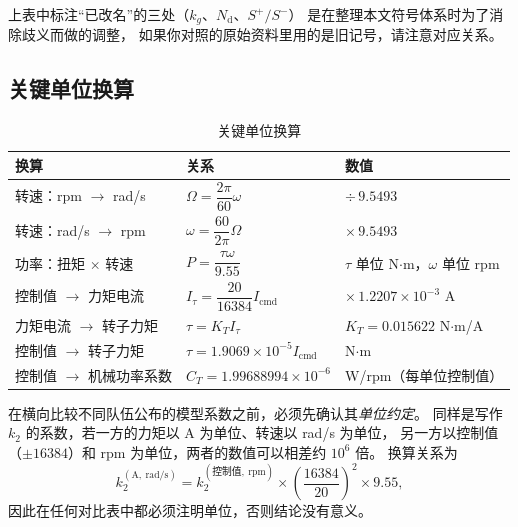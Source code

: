 \documentclass[cn,blue,11pt,device=normal]{elegantnote}
\newcommand{\Icmd}{I_{\mathrm{cmd}}{}}
\newcommand{\Itau}{I_{\tau}{}}
\newcommand{\KT}{K_{T}{}}
\newcommand{\CT}{C_{T}{}}
\begin{document}
\begin{remark}
上表中标注“已改名”的三处（$k_g$、$N_{\mathrm{d}}$、$S^{+}/S^{-}$）
是在整理本文符号体系时为了消除歧义而做的调整，
如果你对照的原始资料里用的是旧记号，请注意对应关系。
\end{remark}


\subsection{关键单位换算}

\begin{table}[htbp]
  \centering
  \small
  \caption{关键单位换算}
  \label{tab:units}
  \begin{tabular}{@{}lll@{}}
    \toprule
    换算 & 关系 & 数值 \\
    \midrule
    转速：rpm $\to$ rad/s      & $\Omega = \dfrac{2\pi}{60}\omega$ & $\div\,9.5493$ \\
    转速：rad/s $\to$ rpm      & $\omega = \dfrac{60}{2\pi}\Omega$ & $\times\,9.5493$ \\
    功率：扭矩 $\times$ 转速   & $P = \dfrac{\tau\omega}{9.55}$    & $\tau$ 单位 N$\cdot$m，$\omega$ 单位 rpm \\
    控制值 $\to$ 力矩电流      & $\Itau = \dfrac{20}{16384}\Icmd$  & $\times\,1.2207\times10^{-3}$ A \\
    力矩电流 $\to$ 转子力矩    & $\tau = \KT\Itau$                 & $\KT = 0.015622$ N$\cdot$m/A \\
    控制值 $\to$ 转子力矩      & $\tau = 1.9069\times10^{-5}\Icmd$ & N$\cdot$m \\
    控制值 $\to$ 机械功率系数  & $\CT = 1.99688994\times10^{-6}$   & W/rpm（每单位控制值） \\
    \bottomrule
  \end{tabular}
\end{table}

\begin{note}
在横向比较不同队伍公布的模型系数之前，必须先确认其\emph{单位约定}。
同样是写作 $k_2$ 的系数，若一方的力矩以 A 为单位、转速以 rad/s 为单位，
另一方以控制值（$\pm16384$）和 rpm 为单位，两者的数值可以相差约 $10^{6}$ 倍。
换算关系为
\begin{equation}
  k_{2}^{(\text{A},\ \mathrm{rad/s})}
  = k_{2}^{(\text{控制值},\ \mathrm{rpm})}
    \times \left(\frac{16384}{20}\right)^{2} \times 9.55 ,
\end{equation}
因此在任何对比表中都必须注明单位，否则结论没有意义。
\end{note}
\end{document}
